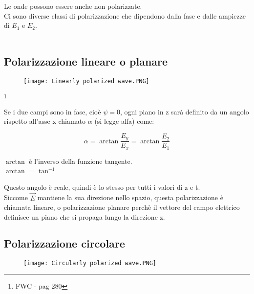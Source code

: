 Le onde possono essere anche non polarizzate. \\ 

Ci sono diverse classi di polarizzazione che dipendono dalla fase e dalle ampiezze di $E_1$ e $E_2$. \\ \\ 

\newpage 

\subsection{Polarizzazione lineare o planare}

\begin{figure}[h]
    \centering
    \texttt{[image: Linearly polarized wave.PNG]}
    
\end{figure}

\footnote{FWC - pag 280}

Se i due campi sono in fase, cioè $\psi = 0$, ogni piano in z sarà definito da un angolo rispetto all'asse x chiamato $\alpha$ (si legge alfa) come: 

{\Large \begin{equation}
    \alpha = \arctan \frac{E_y}{E_x} = \arctan \frac{E_2}{E_1}
\end{equation}}

\begin{tcolorbox}
    $\arctan$ è l'inverso della funzione tangente. \\ $\arctan$ = $\tan ^{-1}$ 
\end{tcolorbox}

Questo angolo è reale, quindi è lo stesso per tutti i valori di z e t. \\ 

Siccome $\vec{E}$ mantiene la sua direzione nello spazio, questa polarizzazione è chiamata lineare, o polarizzazione planare perchè il vettore 
del campo elettrico definisce un piano che si propaga lungo la direzione z. \\ 

\newpage 

\subsection{Polarizzazione circolare} 

\begin{figure}[h]
    \centering
    \texttt{[image: Circularly polarized wave.PNG]}
    
\end{figure}

